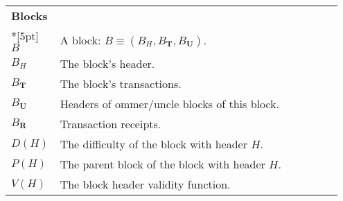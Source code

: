 \documentclass[9pt,oneside]{amsart}
\begin{document}
\begin{longtable}{p{0.10\linewidth}p{0.85\linewidth}}
\vspace{5pt} \\
\midrule
\multicolumn{2}{l}{\textbf{Blocks}} \\*[5pt]
$B$ & A block: $B \equiv (B_H, B_\mathbf{T}, B_\mathbf{U}).$ \\
$B_H$ & The block's header. \\
$B_\mathbf{T}$ & The block's transactions. \\
$B_\mathbf{U}$ & Headers of ommer/uncle blocks of this block. \\
$B_\mathbf{R}$ & Transaction receipts. \\
$D(H)$ & The difficulty of the block with header $H$. \\
$P(H)$ & The parent block of the block with header $H$. \\
$V(H)$ & The block header validity function. \\


\end{longtable}
\end{document}
